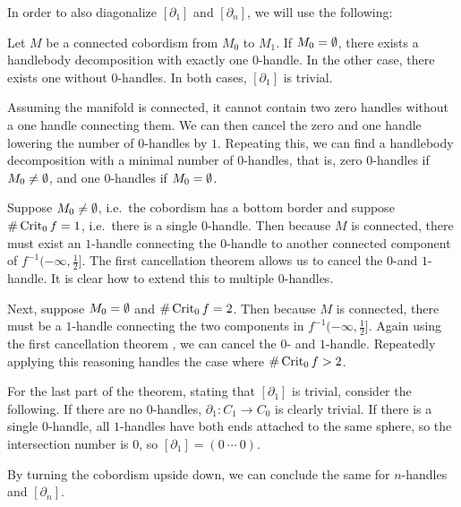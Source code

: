 In order to also diagonalize $[\partial_1]$ and $[\partial_n]$, we will use the following:
\begin{theorem}
    Let $M$ be a connected cobordism from  $ M_0$ to $ M_1$.
    If $ M_0 = \emptyset$, there exists a handlebody decomposition with exactly one $0$-handle. In the other case, there exists one without $0$-handles.
    In both cases, $[\partial_1]$ is trivial.
    \label{thm:no-zero}
\end{theorem}
\begin{marginfigure}
    \centering
    \caption{
        Assuming the manifold is connected, it cannot contain two zero handles without a one handle connecting them.
        We can then cancel the zero and one handle lowering the number of $0$-handles by $1$.
        Repeating this, we can find a handlebody decomposition with a minimal number of $0$-handles, that is, zero $0$-handles if $ M_0 \neq \emptyset$, and one $0$-handles if $ M_0 = \emptyset$.
    }
    \label{fig:without-zero-handles}
\end{marginfigure}
\begin{myproof}
    Suppose $M_0 \neq \emptyset$, i.e.\ the cobordism has a bottom border and suppose $\# \operatorname{Crit}_0 f =1$, i.e.\ there is a single $0$-handle.
    Then because $M$ is connected, there must exist an $1$-handle connecting the $0$-handle to another connected component of $f^{-1}(-\infty, \frac{1}{2}]$.
    The first cancellation theorem allows us to cancel the $0$-and  $1$-handle.
    It is clear how to extend this to multiple $0$-handles.

    Next, suppose $M_0 = \emptyset$ and $\# \operatorname{Crit}_0 f  = 2$. Then because $M$ is  connected, there must be a $1$-handle connecting the two components in $f^{-1}(-\infty, \frac{1}{2}]$. Again using the first cancellation theorem , we can cancel the $0$- and $1$-handle. Repeatedly applying this reasoning handles the case where $\# \operatorname{Crit}_0 f > 2$.

    For the last part of the theorem, stating that $[\partial_1]$ is trivial, consider the following. 
    If there are no  $0$-handles, $\partial_1: C_1 \to  C_0$ is clearly trivial.
    If there is a single $0$-handle, all $1$-handles have both ends attached to the same sphere, so the intersection number is $0$, so $[\partial_1] = (0 \ \cdots \ 0)$.
\end{myproof}
\begin{remark}
    By turning the cobordism upside down, we can conclude the same for $n$-handles and $[\partial_n]$.
\end{remark}

